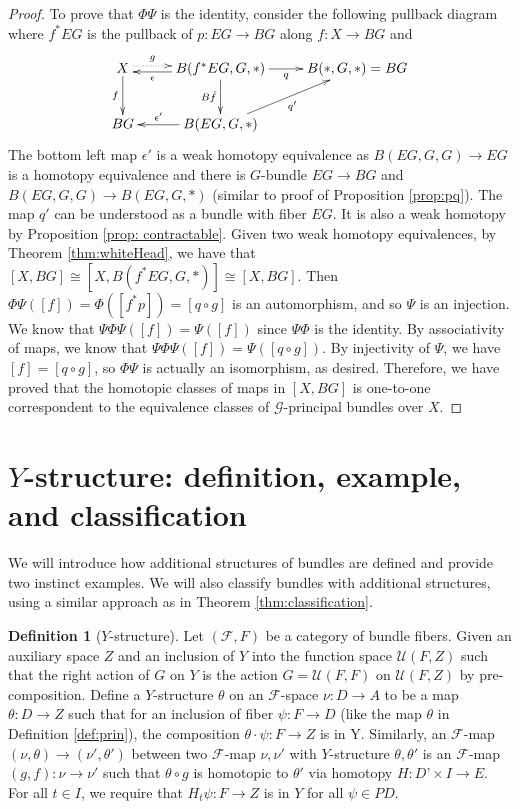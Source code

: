 \documentclass[psamsfonts]{amsart}
\theoremstyle{definition}
\newtheorem{defn}[thm]{Definition}
\theoremstyle{remark}
\numberwithin{equation}{section}
\begin{document}
\begin{proof}
To prove that $\Phi\Psi$ is the identity, consider the following pullback diagram where $f^{*}EG$ is the pullback of $p: EG \rightarrow BG$ along $f: X \rightarrow BG$ and 
\[\xymatrix{
X \ar@{.>}[r]<.5ex>^-{g} \ar[d]_-{f} & B(f^{*}EG, G, *) \ar[l]<.5ex>^-{\epsilon}  \ar[d]_-{B\tilde{f}} \ar[r]_-{q} & B(*, G, *) = BG \\
BG & B(EG, G, *) \ar[l]_-{\epsilon'} \ar[ru]_-{q'} & \\
} \]
The bottom left map $\epsilon'$ is a weak homotopy equivalence as $B(EG, G, G) \to EG$ is a homotopy equivalence and there is $G$-bundle $EG \to BG$ and $B(EG, G, G) \to B(EG, G, *)$ (similar to proof of Proposition \ref{prop:pq}). The map $q'$ can be understood as a bundle with fiber $EG$. It is also a weak homotopy by Proposition \ref{prop: contractable}. Given two weak homotopy equivalences, by Theorem \ref{thm:whiteHead}, we have that $[X, BG] \cong [X, B(f^{*}EG, G, *)] \cong [X, BG]$. Then $\Phi\Psi([f]) = \Phi([f^{*}p]) = [q \circ g]$ is an automorphism, and so $\Psi$ is an injection. We know that $\Psi\Phi\Psi([f]) = \Psi([f])$ since $\Psi\Phi$ is the identity. By associativity of maps, we know that $\Psi\Phi\Psi([f]) = \Psi([q \circ g])$. By injectivity of $\Psi$, we have $[f] = [q \circ g]$, so $\Phi\Psi$ is actually an isomorphism, as desired.
Therefore, we have proved that the homotopic classes of maps in $[X, BG]$ is one-to-one correspondent to the equivalence classes of $\mathcal{G}$-principal bundles over $X$.
\end{proof}





\section{$Y$-structure: definition, example, and classification}
We will introduce how additional structures of bundles are defined and provide two instinct examples. We will also classify bundles with additional structures, using a similar approach as in Theorem \ref{thm:classification}.

\begin{defn}[$Y$-structure]
\label{def:Y}
Let $(\mathcal{F}, F)$ be a category of bundle fibers. Given an auxiliary space $Z$ and an inclusion of $Y$ into the function space $\mathcal{U}(F, Z)$ such that the right action of $G$ on $Y$ is the action $G = \mathcal{U}(F, F)$ on $\mathcal{U}(F, Z)$ by pre-composition. Define a $Y$-structure $\theta$ on an $\mathcal{F}$-space $\nu: D \rightarrow A$ to be a map $\theta: D \rightarrow Z$ such that for an inclusion of fiber $\psi: F \rightarrow D$ (like the map $\theta$ in Definition \ref{def:prin}), the composition $\theta\cdot\psi: F \rightarrow Z$ is in Y. Similarly, an $\mathcal{F}$-map $(\nu, \theta) \rightarrow (\nu', \theta')$ between two $\mathcal{F}$-map $\nu, \nu'$ with $Y$-structure $\theta, \theta'$ is an $\mathcal{F}$-map $(g, f): \nu \rightarrow \nu'$ such that $\theta \circ g$ is homotopic to $\theta'$ via homotopy $H: D’ \times I \rightarrow E$. For all $t \in I$, we require that $H_{t}\psi: F \rightarrow Z$ is in $Y$ for all $\psi \in PD$.
\end{defn} 
\end{document}
